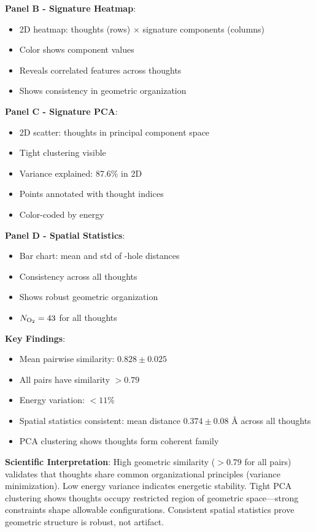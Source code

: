 \documentclass[11pt]{article}
\begin{document}
\textbf{Panel B - Signature Heatmap}:
\begin{itemize}
\item 2D heatmap: thoughts (rows) × signature components (columns)
\item Color shows component values
\item Reveals correlated features across thoughts
\item Shows consistency in geometric organization
\end{itemize}

\textbf{Panel C - Signature PCA}:
\begin{itemize}
\item 2D scatter: thoughts in principal component space
\item Tight clustering visible
\item Variance explained: 87.6\% in 2D
\item Points annotated with thought indices
\item Color-coded by energy
\end{itemize}

\textbf{Panel D - Spatial Statistics}:
\begin{itemize}
\item Bar chart: mean and std of -hole distances
\item Consistency across all thoughts
\item Shows robust geometric organization
\item $N_{\ce{O2}} = 43$ for all thoughts
\end{itemize}

\textbf{Key Findings}:
\begin{itemize}
\item Mean pairwise similarity: $0.828 \pm 0.025$
\item All pairs have similarity $> 0.79$
\item Energy variation: $< 11\%$
\item Spatial statistics consistent: mean distance $0.374 \pm 0.08$ Å across all thoughts
\item PCA clustering shows thoughts form coherent family
\end{itemize}

\textbf{Scientific Interpretation}:
High geometric similarity ($> 0.79$ for all pairs) validates that thoughts share common organizational principles (variance minimization). Low energy variance indicates energetic stability. Tight PCA clustering shows thoughts occupy restricted region of geometric space—strong constraints shape allowable configurations. Consistent spatial statistics prove geometric structure is robust, not artifact.
\end{document}
